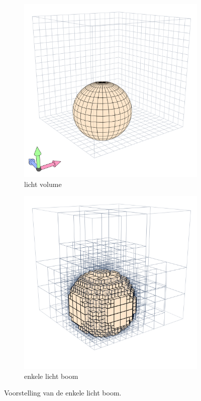 \begin{figure}
  \centering

  \begin{subfigure}[b]{.45\linewidth}
    \includegraphics[width=\textwidth]{./img/raw/hs-slt_left.png}%
    \caption{licht volume}%
    \label{fig:hs-slt-left}%
  \end{subfigure}
  \begin{subfigure}[b]{.45\linewidth}%
    \includegraphics[width=\textwidth]{./img/raw/hs-slt_right.png}%
    \caption{enkele licht boom}%
    \label{fig:hs-slt-right}%
  \end{subfigure}
  \caption{Voorstelling van de enkele licht boom.}
  \label{fig:hs-slt}
\end{figure}
